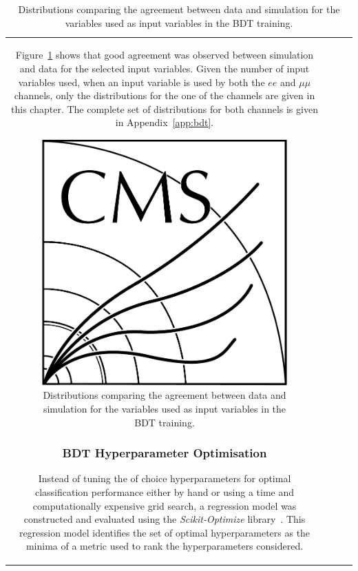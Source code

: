 \begin{table}[htbp]
{\begin{tabular}{cccc}
Figure~\ref{fig:inputFeaturesDataSimAgreement} shows that good agreement was observed between simulation and data for the selected input variables.
Given the number of input variables used, when an input variable is used by both the $ee$ and $\mu\mu$ channels, only the distributions for the one of the channels are given in this chapter.
The complete set of distributions for both channels is given in Appendix~\ref{app:bdt}.

\begin{figure}[htbp]
\centering
\includegraphics[width=0.97\textwidth]{CMS-bw-logo.pdf}
\caption{
Distributions comparing the agreement between data and simulation for the variables used as input variables in the BDT training.}
\label{fig:inputFeaturesDataSimAgreement}
\end{figure}

\subsubsection*{BDT Hyperparameter Optimisation}
Instead of tuning the of choice hyperparameters for optimal classification performance either by hand or using a time and computationally expensive grid search, a regression model was constructed and evaluated using the \emph{Scikit-Optimize} library~\cite{scikit-optimise}.
This regression model identifies the set of optimal hyperparameters as the minima of a metric used to rank the hyperparameters considered.
 

\end{tabular}}
\end{table}
